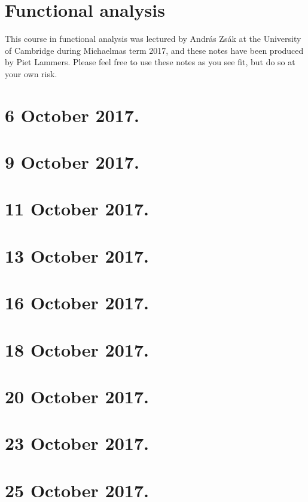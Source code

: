 \documentclass[11pt]{article}
\theoremstyle{definition}
\begin{document}
\section*{\LARGE Functional analysis}

\leftskip=1.5cm\rightskip=1.5cm

This course in functional analysis was lectured by Andr\'as Zs\'ak at the University of Cambridge during Michaelmas term 2017,
and these notes have been produced by Piet Lammers.
Please feel free to use these notes as you see fit, but do so at your own risk.

\leftskip=0cm \rightskip=0cm


\section{6 October 2017.}



\section{9 October 2017.}



\section{11 October 2017.}


\section{13 October 2017.}


\section{16 October 2017.}


\section{18 October 2017.}


\section{20 October 2017.}


\section{23 October 2017.}


\section{25 October 2017.}

\end{document}
